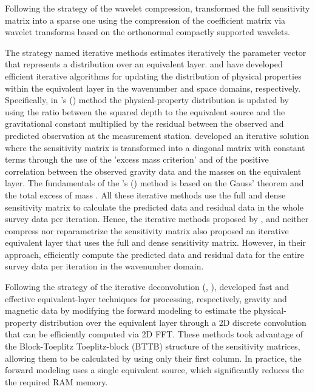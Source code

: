 Following the strategy of the  wavelet compression, \cite{li-oldenburg_2010} transformed the full sensitivity matrix into a sparse one using the compression of the coefficient matrix via wavelet transforms based on the orthonormal compactly supported wavelets. 

The strategy named iterative methods estimates iteratively the parameter vector that represents a distribution over an equivalent layer.
\cite{xia-sprowl1991} and \cite{xia-etal1993} have developed efficient iterative algorithms 
for updating the distribution of physical properties within the equivalent layer in the wavenumber and space domains, respectively.
Specifically, in \citeauthor{xia-sprowl1991}'s (\citeyear{xia-sprowl1991}) method the physical-property distribution is updated by using the ratio between the squared depth to the equivalent source and the gravitational constant multiplied by the residual between the observed and predicted observation at the measurement station. 
\cite{siqueira-etal2017} developed an iterative solution where the sensitivity matrix is transformed into a diagonal matrix with constant terms through the use of the 'excess mass criterion' and of the positive correlation between the observed gravity data and the masses on the equivalent layer.
The fundamentals of the \citeauthor{siqueira-etal2017}'s (\citeyear{siqueira-etal2017}) method
is  based on the Gauss' theorem \cite[e.g.,][p. 43]{kellogg1967} and the total excess of mass \cite[e.g.,][p. 60]{blakely1996}.
All these iterative methods use the full and dense sensitivity matrix to calculate the predicted data 
and residual data in the whole survey data per iteration.
Hence, the iterative methods proposed by \cite{xia-sprowl1991}, \cite{xia-etal1993} and 
\cite{siqueira-etal2017} neither compress nor reparametrize the sensitivity  matrix
\cite{jirigalatu-ebbing2019} also proposed an iterative equivalent layer that uses the full and dense sensitivity matrix. 
However, in their approach, \cite{jirigalatu-ebbing2019}  efficiently compute  the predicted data and 
residual data for the entire survey data per iteration in the wavenumber domain.

Following the strategy of the  iterative deconvolution \citeauthor{takahashi2020} (\citeyear{takahashi2020}, \citeyear{takahashi2022}), developed fast and effective equivalent-layer techniques for processing, respectively,  gravity and magnetic data by modifying the forward modeling to estimate the physical-property distribution  over the equivalent layer through a 2D discrete convolution that can be efficiently 
computed via 2D FFT.
These methods took advantage of the Block-Toeplitz Toeplitz-block (BTTB) structure of the sensitivity matrices, allowing them to be calculated by using only their first column.
In practice, the forward modeling uses a single equivalent source, which significantly reduces the the required RAM memory. 

